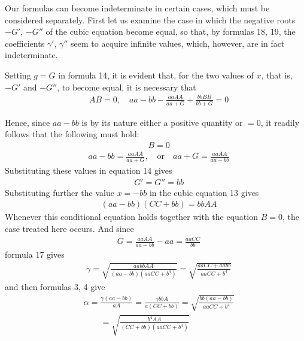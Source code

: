 \begingroup
\renewcommand{\arraystretch}{1.45}

Our formulas can become indeterminate in certain cases, which must be considered separately. First let us examine the case in which the negative roots $-G'$, $-G''$ of the cubic equation become equal, so that, by formulas 18, 19, the coefficients $\gamma'$, $\gamma''$ seem to acquire infinite values, which, however, are in fact indeterminate.

Setting $g=G$ in formula 14, it is evident that, for the two values of $x$, that is, $-G'$ and $-G''$, to become equal, it is necessary that
\[
\begin{aligned}
&AB=0,\quad aa-bb-\frac{aaAA}{aa+G}+\frac{bbBB}{bb+G}=0
\end{aligned}
\]
\par Hence, since $aa-bb$ is by its nature either a positive quantity or $=0$, it readily follows that the following must hold:
\[
\begin{aligned}
&B=0
\end{aligned}
\]
\[
\begin{aligned}
&aa-bb=\frac{aaAA}{aa+G},\quad\text{or}\quad aa+G=\frac{aaAA}{aa-bb}
\end{aligned}
\]
Substituting these values in equation 14 gives
\[
\begin{aligned}
&G'=G''=bb
\end{aligned}
\]
Substituting further the value $x=-bb$ in the cubic equation 13 gives
\[
\begin{aligned}
&(aa-bb)(CC+bb)=bbAA
\end{aligned}
\]
Whenever this conditional equation holds together with the equation $B=0$, the case treated here occurs. 
And since
\[
\begin{aligned}
&G=\frac{aaAA}{aa-bb}-aa=\frac{aaCC}{bb}
\end{aligned}
\]
\noindent{}
formula 17 gives
\[
\begin{aligned}
&\gamma=\surd{\frac{aabbAA}{(aa-bb)(aaCC+b^4)}}
=\surd{\frac{aaCC+aabb}{aaCC+b^4}}
\end{aligned}
\]
and then formulas 3, 4 give
\[
\begin{aligned}
&\alpha=\frac{\gamma(aa-bb)}{aA}=\frac{\gamma bbA}{a(CC+bb)}
=\surd{\frac{bb(aa-bb)}{aaCC+b^4}}
\\[6pt]
&\qquad{}=\surd{\frac{b^4AA}{(CC+bb)(aaCC+b^4)}}
\end{aligned}
\]
